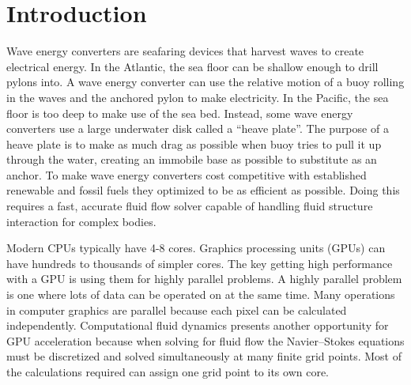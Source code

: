 \maketitle

\mainmatter

\chapter{Introduction}
Wave energy converters are seafaring devices that harvest waves to create electrical energy. 
In the Atlantic, the sea floor can be shallow enough to drill pylons into. 
A wave energy converter can use the relative motion of a buoy rolling in the waves and the anchored pylon to make electricity. 
In the Pacific, the sea floor is too deep to make use of the sea bed. 
Instead, some wave energy converters use a large underwater disk called a ``heave plate''.
The purpose of a heave plate is to make as much drag as possible when buoy tries to pull it up through the water, creating an immobile base as possible to substitute as an anchor. 
To make wave energy converters cost competitive with established renewable and fossil fuels they optimized to be as efficient as possible. 
Doing this requires a fast, accurate fluid flow solver capable of handling fluid structure interaction for complex bodies. 

Modern CPUs typically have 4-8 cores. 
Graphics processing units (GPUs) can have hundreds to thousands of simpler cores. 
The key getting high performance with a GPU is using them for highly parallel problems.
A highly parallel problem is one where lots of data can be operated on at the same time. 
Many operations in computer graphics are parallel because each pixel can be calculated independently. 
Computational fluid dynamics presents another opportunity for GPU acceleration because when solving for fluid flow the Navier--Stokes equations must be discretized and solved simultaneously at many finite grid points. 
Most of the calculations required can assign one grid point to its own core. 


